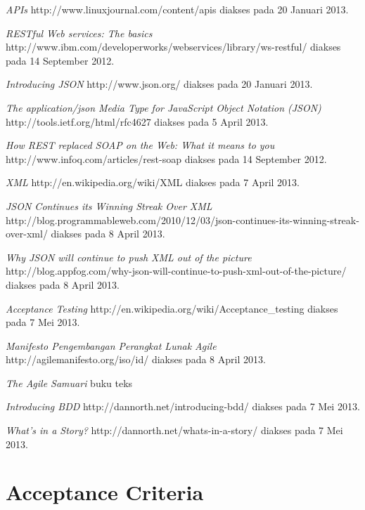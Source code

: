 \documentclass[a4paper, 12pt, oneside]{report}
\begin{document}
\begin{thebibliography}{99}
  \emph{APIs}
  http://www.linuxjournal.com/content/apis
  diakses pada 20 Januari 2013.

  \emph{RESTful Web services: The basics}
  \\http://www.ibm.com/developerworks/webservices/library/ws-restful/
  diakses pada 14 September 2012.

  \emph{Introducing JSON} http://www.json.org/
  diakses pada 20 Januari 2013.
  
  \emph{The application/json Media Type for JavaScript Object Notation (JSON)} http://tools.ietf.org/html/rfc4627
  diakses pada 5 April 2013.
    
  \emph{How REST replaced SOAP on the Web: What it means to you}
  http://www.infoq.com/articles/rest-soap
  diakses pada 14 September 2012.
  
  \emph{XML}
  http://en.wikipedia.org/wiki/XML
  diakses pada 7 April 2013.
  
  \emph{JSON Continues its Winning Streak Over XML}
  http://blog.programmableweb.com/2010/12/03/json-continues-its-winning-streak-over-xml/
  diakses pada 8 April 2013.
  
  \emph{Why JSON will continue to push XML out of the picture}
  http://blog.appfog.com/why-json-will-continue-to-push-xml-out-of-the-picture/
  diakses pada 8 April 2013.
  
  \emph{Acceptance Testing}
  http://en.wikipedia.org/wiki/Acceptance\_testing
  diakses pada 7 Mei 2013.

  \emph{Manifesto Pengembangan Perangkat Lunak Agile}
  http://agilemanifesto.org/iso/id/
  diakses pada 8 April 2013.
  
  \emph{The Agile Samuari}
  buku teks
  
  \emph{Introducing BDD}
  http://dannorth.net/introducing-bdd/
  diakses pada 7 Mei 2013.
  
  \emph{What's in a Story?}
  http://dannorth.net/whats-in-a-story/
  diakses pada 7 Mei 2013.
 
\end{thebibliography}

\appendix
\chapter{Acceptance Criteria} \label{lampiran:a}
\end{document}
